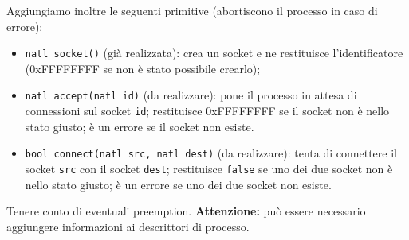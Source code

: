 Aggiungiamo inoltre le seguenti primitive (abortiscono il processo in caso di errore):
\begin{itemize}
  \item \verb|natl socket()| (gi\`a realizzata): crea un socket e ne restituisce l'identificatore
    (0xFFFFFFFF se non \`e stato possibile crearlo);
  \item \verb|natl accept(natl id)| (da realizzare): pone il processo in attesa di connessioni
    sul socket \verb|id|;
    restituisce 0xFFFFFFFF se il socket non \`e nello stato giusto;
    \`e un errore se il socket non esiste.
  \item \verb|bool connect(natl src, natl dest)| (da realizzare):
    tenta di connettere il socket \verb|src| con il socket \verb|dest|; restituisce \verb|false|
    se uno dei due socket non \`e nello stato giusto; \`e un errore se uno dei due socket
    non esiste.
\end{itemize}
Tenere conto di eventuali preemption.
{\bf Attenzione:} pu\`o essere necessario aggiungere informazioni ai descrittori di processo.
